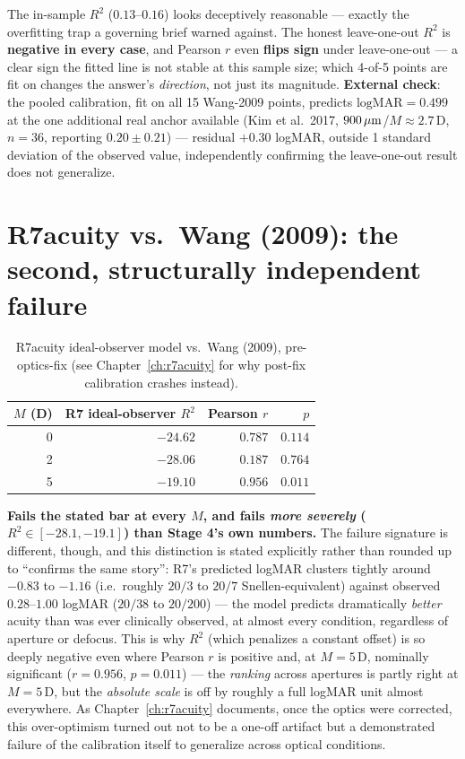 The in-sample $R^2$ ($0.13$--$0.16$) looks deceptively reasonable --- exactly the
overfitting trap a governing brief warned against. The honest leave-one-out $R^2$ is
\textbf{negative in every case}, and Pearson $r$ even \textbf{flips sign} under
leave-one-out --- a clear sign the fitted line is not stable at this sample size; which
4-of-5 points are fit on changes the answer's \emph{direction}, not just its magnitude.
\textbf{External check}: the pooled calibration, fit on all 15 Wang-2009 points,
predicts $\text{logMAR}=0.499$ at the one additional real anchor available (Kim et al.\
2017, $900\,\mu\text{m}$/$M\approx2.7\,$D, $n=36$, reporting $0.20\pm0.21$) --- residual
$+0.30$ logMAR, outside 1 standard deviation of the observed value, independently
confirming the leave-one-out result does not generalize.

\section{R7acuity vs.\ Wang (2009): the second, structurally independent failure}

\begin{table}[htbp]
\centering
\begin{tabular}{rrrr}
\toprule
$M$ (D) & R7 ideal-observer $R^2$ & Pearson $r$ & $p$ \\
\midrule
0 & $-24.62$ & $0.787$ & $0.114$ \\
2 & $-28.06$ & $0.187$ & $0.764$ \\
5 & $-19.10$ & $0.956$ & $\mathbf{0.011}$ \\
\bottomrule
\end{tabular}
\caption{R7acuity ideal-observer model vs.\ Wang (2009), pre-optics-fix (see Chapter~\ref{ch:r7acuity} for why post-fix calibration crashes instead).}
\label{tab:r7-wang}
\end{table}

\textbf{Fails the stated bar at every $M$, and fails \emph{more severely}
($R^2\in[-28.1,-19.1]$) than Stage 4's own numbers.} The failure signature is
different, though, and this distinction is stated explicitly rather than rounded up to
``confirms the same story'': R7's predicted logMAR clusters tightly around
$-0.83$ to $-1.16$ (i.e.\ roughly $20/3$ to $20/7$ Snellen-equivalent) against observed
$0.28$--$1.00$ logMAR ($20/38$ to $20/200$) --- the model predicts dramatically
\emph{better} acuity than was ever clinically observed, at almost every condition,
regardless of aperture or defocus. This is why $R^2$ (which penalizes a constant
offset) is so deeply negative even where Pearson $r$ is positive and, at $M=5\,$D,
nominally significant ($r=0.956$, $p=0.011$) --- the \emph{ranking} across apertures is
partly right at $M=5\,$D, but the \emph{absolute scale} is off by roughly a full
logMAR unit almost everywhere. As Chapter~\ref{ch:r7acuity} documents, once the optics
were corrected, this over-optimism turned out not to be a one-off artifact but a
demonstrated failure of the calibration itself to generalize across optical
conditions.

